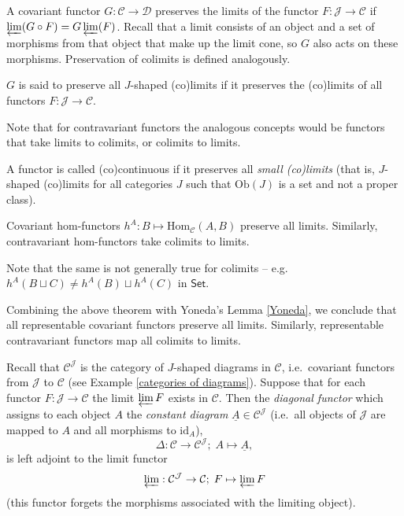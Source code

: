 \begin{defn}
    A covariant functor $G:\mathcal{C}\to\mathcal{D}$ preserves the limits of the functor $F:\mathcal{J}\to \mathcal{C}$ if $\varprojlim(G\circ F)=G \varprojlim(F)$. Recall that a limit consists of an object and a set of morphisms from that object that make up the limit cone, so $G$ also acts on these morphisms. Preservation of colimits is defined analogously.

    $G$ is said to preserve all $J$-shaped (co)limits if it preserves the (co)limits of all functors $F:\mathcal{J}\to \mathcal{C}$. 

    Note that for contravariant functors the analogous concepts would be functors that take limits to colimits, or colimits to limits.
\end{defn}    
\begin{defn}
    A functor is called (co)continuous if it preserves all \emph{small (co)limits} (that is, $J$-shaped (co)limits for all categories $J$ such that $\mathrm{Ob}(J)$ is a set and not a proper class).
\end{defn}
\begin{thm}
    Covariant hom-functors $h^A:B\mapsto \mathrm{Hom}_{\mathcal{C}}(A,B)$ preserve all limits. Similarly, contravariant hom-functors take colimits to limits.
\end{thm}
\begin{rem}
     Note that the same is not generally true for colimits -- e.g.\ $h^A(B\sqcup C)\neq h^A(B)\sqcup h^A(C)$ in $\mathsf{Set}$.
\end{rem}
\begin{cor}
    Combining the above theorem with Yoneda's Lemma \ref{Yoneda}, we conclude that all representable covariant functors preserve all limits. Similarly, representable contravariant functors map all colimits to limits.
\end{cor}
\begin{thm}\label{thm diagonal functor adjoint to limit}
    Recall that $\mathcal{C}^\mathcal{J}$ is the category of $J$-shaped diagrams in $\mathcal{C}$, i.e.\ covariant functors from $\mathcal{J}$ to $\mathcal{C}$ (see Example \ref{categories of diagrams}). Suppose that for each functor $F:\mathcal{J}\to\mathcal{C}$ the limit $\varprojlim F$ exists in $\mathcal{C}$. Then the \emph{diagonal functor} which assigns to each object $A$ the \emph{constant diagram} $\underline A\in \mathcal{C}^\mathcal{J}$ (i.e.\ all objects of $\mathcal{J}$ are mapped to $A$ and all morphisms to $\mathrm{id}_A$),
    \[\Delta: \mathcal{C}\to \mathcal{C}^{\mathcal{J}};\; A\mapsto \underline{A},\]
    is left adjoint to the limit functor
    \[\varprojlim: \mathcal{C}^\mathcal{J}\to \mathcal{C};\; F\mapsto \varprojlim F\]
    (this functor forgets the morphisms associated with the limiting object).
\end{thm}
